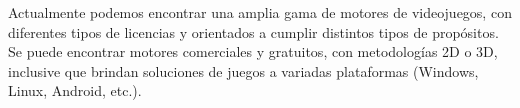 Actualmente podemos encontrar una amplia gama de motores de videojuegos, con diferentes tipos de licencias y orientados a cumplir distintos tipos de propósitos. Se puede encontrar motores comerciales y gratuitos, con metodologías 2D o 3D, inclusive que brindan soluciones de juegos a variadas plataformas (Windows, Linux, Android, etc.).\\ 


